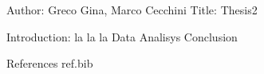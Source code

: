Author: Greco Gina, Marco Cecchini
Title: Thesis2

Introduction: la la la
Data
Analisys
Conclusion


References
ref.bib
